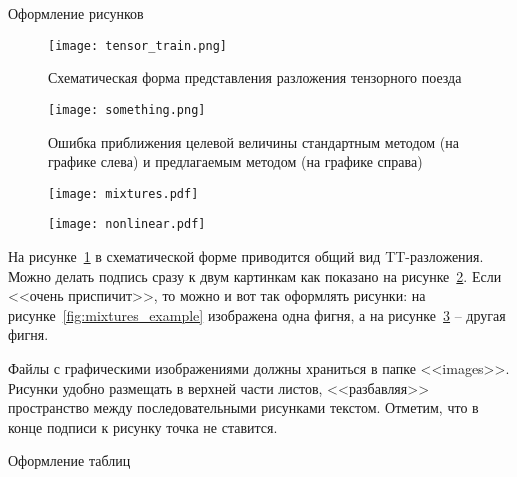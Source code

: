   {Оформление рисунков}

  \begin{figure}[!t]
    \centering
    \texttt{[image: tensor\_train.png]}
    \caption{
      Схематическая форма представления разложения тензорного поезда
    }
    \label{fig:tensor_train}
  \end{figure}

  \begin{figure}[t!]
    \centering
    \texttt{[image: something.png]}
    \caption{
      Ошибка приближения целевой величины стандартным методом  (на графике слева) и предлагаемым методом  (на графике справа)
    }
    \label{fig:demo_two_pict}
  \end{figure}

  \begin{figure}[t]
    \begin{minipage}{.37\textwidth}
      \centering
      \texttt{[image: mixtures.pdf]}
      \label{fig:mixtures_example}
    \end{minipage}
    \hspace{.03\textwidth}
    \begin{minipage}{.57\textwidth}
      \centering
      \texttt{[image: nonlinear.pdf]}
      \vskip 0.155in
      \label{fig:plot_example_nonlinear}
    \end{minipage}
  \end{figure}

  На рисунке~\ref{fig:tensor_train} в схематической форме приводится общий вид TT-разложения.
  Можно делать подпись сразу к двум картинкам как показано на рисунке~\ref{fig:demo_two_pict}.
  Если <<очень приспичит>>, то можно и вот так оформлять рисунки: на рисунке~\ref{fig:mixtures_example} изображена одна фигня, а на рисунке~\ref{fig:plot_example_nonlinear} -- другая фигня.

  Файлы с графическими изображениями должны храниться в папке <<images>>.
  Рисунки удобно размещать в верхней части листов, <<разбавляя>> пространство между последовательными рисунками текстом.
  Отметим, что в конце подписи к рисунку точка не ставится.

  {Оформление таблиц}

